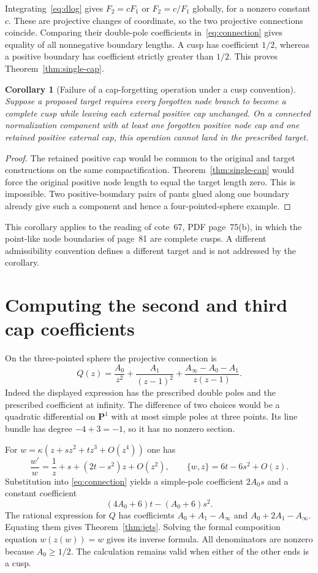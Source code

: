 \documentclass[11pt,a4paper]{article}
\newtheorem{corollary}[theorem]{Corollary}
\theoremstyle{definition}
\begin{document}
Integrating~\eqref{eq:dlog} gives $F_2=cF_1$ or $F_2=c/F_1$ globally, for a nonzero constant $c$. These are projective changes of coordinate, so the two projective connections coincide. Comparing their double-pole coefficients in~\eqref{eq:connection} gives equality of all nonnegative boundary lengths. A cusp has coefficient $1/2$, whereas a positive boundary has coefficient strictly greater than $1/2$. This proves Theorem~\ref{thm:single-cap}.

\begin{corollary}[Failure of a cap-forgetting operation under a cusp convention]\label{cor:forget}
Suppose a proposed target requires every forgotten node branch to become a complete cusp while leaving each external positive cap unchanged. On a connected normalization component with at least one forgotten positive node cap and one retained positive external cap, this operation cannot land in the prescribed target.
\end{corollary}
\begin{proof}
The retained positive cap would be common to the original and target constructions on the same compactification. Theorem~\ref{thm:single-cap} would force the original positive node length to equal the target length zero. This is impossible. Two positive-boundary pairs of pants glued along one boundary already give such a component and hence a four-pointed-sphere example.
\end{proof}
This corollary applies to the reading of cote~67, PDF page~75(b), in which the point-like node boundaries of page~81 are complete cusps. A different admissibility convention defines a different target and is not addressed by the corollary.

\section{Computing the second and third cap coefficients}
On the three-pointed sphere the projective connection is
\[
 Q(z)=\frac{A_0}{z^2}+\frac{A_1}{(z-1)^2}
       +\frac{A_\infty-A_0-A_1}{z(z-1)}.
\]
Indeed the displayed expression has the prescribed double poles and the prescribed coefficient at infinity. The difference of two choices would be a quadratic differential on $\mathbf P^1$ with at most simple poles at three points. Its line bundle has degree $-4+3=-1$, so it has no nonzero section.

For $w=\kappa(z+s z^2+t z^3+O(z^4))$ one has
\[
 \frac{w'}w=\frac1z+s+(2t-s^2)z+O(z^2),\qquad
 \{w,z\}=6t-6s^2+O(z).
\]
Substitution into \eqref{eq:connection} yields a simple-pole coefficient $2A_0s$ and a constant coefficient
\[
 (4A_0+6)t-(A_0+6)s^2.
\]
The rational expression for $Q$ has coefficients $A_0+A_1-A_\infty$ and $A_0+2A_1-A_\infty$. Equating them gives Theorem~\ref{thm:jets}. Solving the formal composition equation $w(z(w))=w$ gives its inverse formula. All denominators are nonzero because $A_0\ge1/2$. The calculation remains valid when either of the other ends is a cusp.
\end{document}
